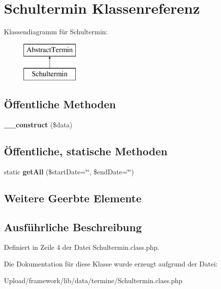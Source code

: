 \hypertarget{class_schultermin}{}\section{Schultermin Klassenreferenz}
\label{class_schultermin}
Klassendiagramm für Schultermin\+:\begin{figure}[H]
\begin{center}
\leavevmode
\includegraphics[height=2.000000cm]{class_schultermin}
\end{center}
\end{figure}
\subsection*{Öffentliche Methoden}
\begin{DoxyCompactItemize}
\item 
\mbox{\label{class_schultermin_a2079f09183245aa89a2760053e171ae5}} 
{\bfseries \+\_\+\+\_\+construct} (\$data)
\end{DoxyCompactItemize}
\subsection*{Öffentliche, statische Methoden}
\begin{DoxyCompactItemize}
\item 
\mbox{\label{class_schultermin_a093d4a8e98d54a4efca64028833977ff}} 
static {\bfseries get\+All} (\$start\+Date=\char`\"{}\char`\"{}, \$end\+Date=\char`\"{}\char`\"{})
\end{DoxyCompactItemize}
\subsection*{Weitere Geerbte Elemente}


\subsection{Ausführliche Beschreibung}


Definiert in Zeile 4 der Datei Schultermin.\+class.\+php.



Die Dokumentation für diese Klasse wurde erzeugt aufgrund der Datei\+:\begin{DoxyCompactItemize}
\item 
Upload/framework/lib/data/termine/Schultermin.\+class.\+php\end{DoxyCompactItemize}
